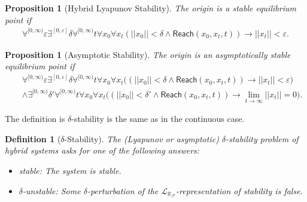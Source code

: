 \documentclass[12pt]{article}
\theoremstyle{plain}
\newtheorem{proposition}[theorem]{Proposition}
\newtheorem{definition}[theorem]{Definition}
\theoremstyle{definition}
\newcommand{\reach}{\mathsf{Reach}}
\newcommand{\lrf}{\mathcal{L}_{\mathbb{R}_{\mathcal{F}}}}
\begin{document}
\begin{proposition}[Hybrid Lyapunov Stability]
The origin is a stable equilibrium point if
\begin{eqnarray*}
\forall^{[0,\infty)} \varepsilon\exists^{[0,\varepsilon]} \delta \forall^{[0,\infty)} t\forall x_0\forall x_t (||x_0||<\delta \wedge \reach(x_0,x_t,t) )\rightarrow ||x_t||<\varepsilon.
\end{eqnarray*}
\end{proposition}
\begin{proposition}[Asymptotic Stability]
The origin is an asymptotically stable equilibrium point if
\begin{eqnarray*}
& &\forall^{[0,\infty)} \varepsilon\exists^{[0,\varepsilon]} \delta\forall^{[0,\infty)} t\forall x_0\forall x_t\Big((||x_0||<\delta \wedge \reach(x_0,x_t,t) )\rightarrow ||x_t||<\varepsilon\Big)\\
& &\wedge \exists^{[0,\infty)} \delta'  \forall^{[0,\infty)} t\forall x_0\forall x_t\Big( (||x_0||<\delta'\wedge \reach(x_0,x_t,t))\rightarrow \lim_{t\rightarrow \infty} ||x_t|| = 0\Big).
\end{eqnarray*}
\end{proposition}
The definition is $\delta$-stability is the same as in the continuous case.
\begin{definition}[$\delta$-Stability]\label{sl}
The (Lyapunov or asymptotic) $\delta$-stability problem of hybrid systems asks for one of the following answers:
\begin{itemize}
\item {\sf stable}: The system is stable.
\item {\sf $\delta$-unstable}: Some $\delta$-perturbation of the $\lrf$-representation of stability is false.
\end{itemize}
\end{definition}
\end{document}
